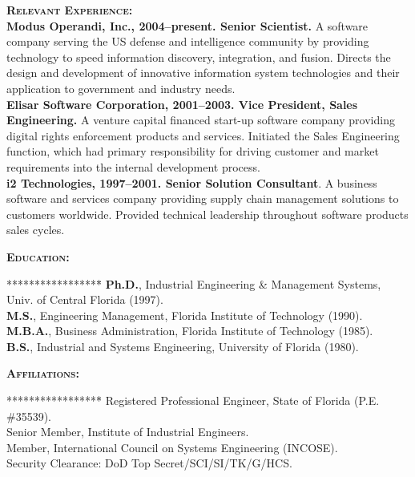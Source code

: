 \documentclass{sbir}
\begin{document}
{\vspace{-6pt}
\textbf{\textsc{Relevant Experience:}}~\\
{\bfseries Modus Operandi, Inc., 2004--present. Senior Scientist.} A software company serving the US defense and intelligence community by providing technology to speed information discovery, integration, and fusion. Directs the design and development of innovative information system technologies and their application to government and industry needs.~\\
{\bfseries Elisar Software Corporation, 2001--2003. Vice President, Sales Engineering.} A venture capital financed start-up software company providing digital rights enforcement products and services. Initiated the Sales Engineering function, which had primary responsibility for driving customer and market requirements into the internal development process.~\\
{\bfseries i2 Technologies, 1997--2001. Senior Solution Consultant}. A business software and services company providing supply chain management solutions to customers worldwide. Provided technical leadership throughout software products sales cycles.

\vspace{-6pt}
\textbf{\textsc{Education:}}
\vspace{-30pt}
\begin{tabbing}*****************\=\kill
 \> {\bfseries Ph.D.}, Industrial Engineering \& Management Systems, Univ. of Central Florida (1997). \\
 \> {\bfseries M.S.}, Engineering Management, Florida Institute of Technology (1990). \\
 \> {\bfseries M.B.A.}, Business Administration, Florida Institute of Technology (1985). \\
 \> {\bfseries B.S.}, Industrial and Systems Engineering, University of Florida (1980).
\end{tabbing}

\vspace{-12pt}
\textbf{\textsc{Affiliations:}}
\vspace{-30pt}
\begin{tabbing}*****************\=\kill
\> Registered Professional Engineer, State of Florida (P.E. \#35539). \\
\> Senior Member, Institute of Industrial Engineers. \\
\> Member, International Council on Systems Engineering (INCOSE). \\
\> Security Clearance: DoD Top Secret/SCI/SI/TK/G/HCS.
\end{tabbing}
\vspace{-12pt}

}
\end{document}
